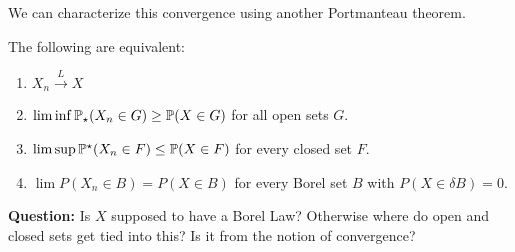 We can characterize this convergence using another Portmanteau theorem. 
\begin{theorem}[Portmanteau]
	\label{thm:portmanteau2}
	The following are equivalent:
	\begin{enumerate}
		\item \(X_n \overset{L}{\to} X\)
		\item \(\lim\inf \P_\star(X_n \in G) \geq \P(X \in G)\) for all open sets \(G\).
		\item \(\lim\sup \P^\star(X_n \in F) \leq \P(X \in F)\) for every closed set \(F\).
		\item \(\lim P(X_n \in B) = P(X \in B)\) for every Borel set  \(B\) with  \(P(X \in \delta B) = 0\).
	\end{enumerate}
\end{theorem}
\textbf{Question:} Is \(X\) supposed to have a Borel Law? Otherwise where do open and closed sets get tied into this? Is it from the notion of convergence?
